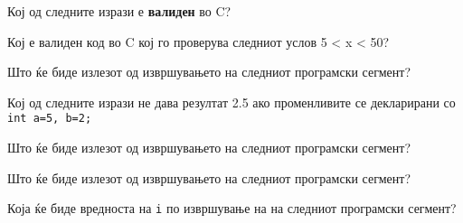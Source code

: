 \documentclass[11pt]{examdesign}
\begin{document}

\begin{multiplechoice}[title={},suppressprefix=yes,rearrange=no]

\begin{question}
Кој од следните изрази е \textbf{валиден} во C?
\end{question}

\begin{question}
Кој е валиден код во C кој го проверува следниот услов 5 < x <
50?
\end{question}

\begin{question}
Што ќе биде излезот од извршувањето на следниот програмски сегмент?
\end{question}

\begin{question}
Кој од следните изрази не дава резултат 2.5 ако променливите се декларирани со \texttt{int a=5, b=2;}
\end{question}

\begin{question}
Што ќе биде излезот од извршувањето на следниот програмски сегмент?
\end{question}
  
\begin{question}
Што ќе биде излезот од извршувањето на следниот програмски сегмент?
\end{question}

\begin{question}
Која ќе биде вредноста на \texttt{i} по извршување на на следниот програмски сегмент?
\end{question}
  

\end{multiplechoice}
\end{document}
